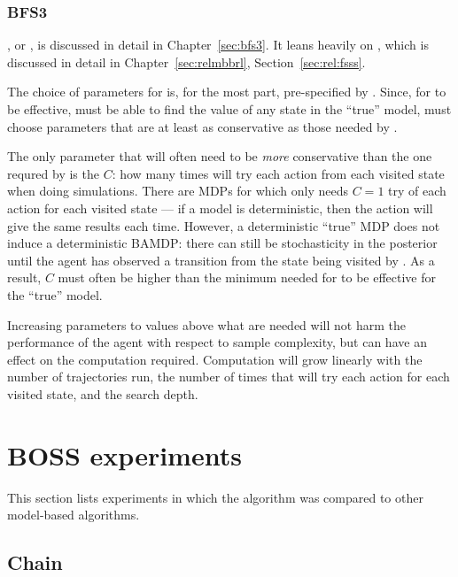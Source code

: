 \subsubsection{BFS3}

, or , is discussed in detail in Chapter~\ref{sec:bfs3}. It leans heavily on , which is discussed in detail in Chapter~\ref{sec:relmbbrl}, Section~\ref{sec:rel:fsss}.

The choice of parameters for  is, for the most part, pre-specified by . Since, for  to be effective,  must be able to find the value of any state in the ``true'' model,  must choose parameters that are at least as conservative as those needed by .

The only parameter that will often need to be \emph{more} conservative than the one requred by  is the $C$: how many times  will try each action from each visited state when doing simulations. There are MDPs for which  only needs $C=1$ try of each action for each visited state --- if a model is deterministic, then the action will give the same results each time. However, a deterministic ``true'' MDP does not induce a deterministic BAMDP: there can still be stochasticity in the posterior until the agent has observed a transition from the state being visited by . As a result, $C$ must often be higher than the minimum needed for  to be effective for the ``true'' model.

Increasing parameters to values above what are needed will not harm the performance of the agent with respect to sample complexity, but can have an effect on the computation required. Computation will grow linearly with the number of trajectories run, the number of times that  will try each action for each visited state, and the search depth.

\section{BOSS experiments}

This section lists experiments in which the  algorithm was compared to other model-based algorithms.

\subsection{Chain}



